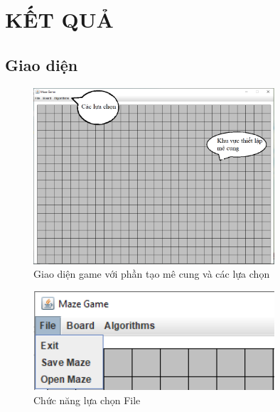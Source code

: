 
\chapter{KẾT QUẢ} %

\label{Chapter3} %


\section{Giao diện}

\begin{figure}[h!]
	\centering
	\includegraphics[width=0.8\textwidth]{
		Figures/figs/1.PNG
	}
	\caption[Giao diện game với phần tạo mê cung và các lựa chọn]{
		Giao diện game với phần tạo mê cung và các lựa chọn 
	}
	\label{fig:hinhe}
\end{figure}


\begin{figure}[h!]
	\centering
	\includegraphics[width=0.8\textwidth]{
		Figures/figs/2.PNG
	}
	\caption[Chức năng lựa chọn File]{
		Chức năng lựa chọn File 
	}
	\label{fig:hinhf}
\end{figure}


